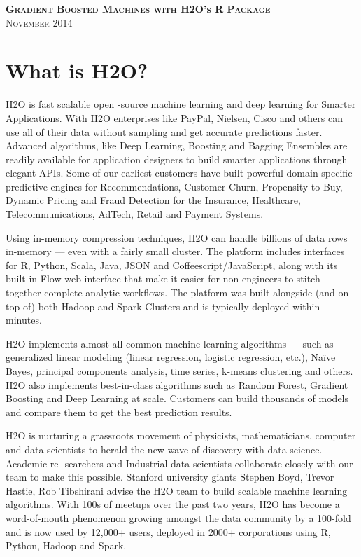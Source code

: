 \documentclass[11pt]{article}
\begin{document}
\thispagestyle{empty} %

\begin{center}
\textsc{\Large\bf{Gradient Boosted Machines with H2O's R Package}}
\\

\textsc{November 2014}
\end{center}
\tableofcontents

\newpage
\section{What is H2O?}

H2O is fast scalable open -source machine learning and deep learning for Smarter Applications. With H2O enterprises like PayPal, Nielsen, Cisco and others can use all of their data without sampling and get accurate predictions faster. Advanced algorithms, like Deep Learning, Boosting and Bagging Ensembles are readily available for application designers to build smarter applications through elegant APIs. Some of our earliest customers have built powerful domain-specific predictive engines for Recommendations, Customer Churn, Propensity to Buy, Dynamic Pricing and Fraud Detection for the Insurance, Healthcare, Telecommunications, AdTech,
Retail and Payment Systems.

Using in-memory compression techniques, H2O can handle billions of data rows in-memory — even with a fairly small cluster. The platform includes interfaces for R, Python, Scala, Java, JSON and Coffeescript/JavaScript, along with its built-in Flow web interface that make it easier for non-engineers to stitch together complete analytic workflows. The platform was built alongside (and on top of) both Hadoop and Spark Clusters and is typically deployed within minutes.

H2O implements almost all common machine learning algorithms — such as generalized linear modeling (linear regression, logistic regression, etc.), Na\"{i}ve Bayes, principal components analysis, time series, k-means clustering and others. H2O also implements best-in-class algorithms such as Random Forest, Gradient Boosting and Deep Learning at scale. Customers can build thousands of models and compare them to get the best prediction results.

H2O is nurturing a grassroots movement of physicists, mathematicians, computer and data scientists to herald the new wave of discovery with data science. Academic re- searchers and Industrial data scientists collaborate closely with our team to make this possible. Stanford university giants Stephen Boyd, Trevor Hastie, Rob Tibshirani advise the H2O team to build scalable machine learning algorithms. With 100s of meetups over the past two years, H2O has become a word-of-mouth phenomenon growing amongst the data community by a 100-fold and is now used by 12,000+ users, deployed in 2000+ corporations using R, Python, Hadoop and Spark.
\end{document}
